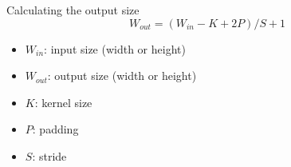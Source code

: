 \documentclass{beamer}
\begin{document}

		\begin{frame}{Calculating the output size}
		\[
		W_{out} = (W_{in}-K+2P)/S+1
		\]
	\begin{itemize}
		\item $W_{in}$: input size (width or height)
		\item $W_{out}$: output size (width or height)
		 \item  $K$: kernel size
			\item $P$: padding
			\item $S$: stride
	\end{itemize}
		\end{frame}
	
\end{document}

